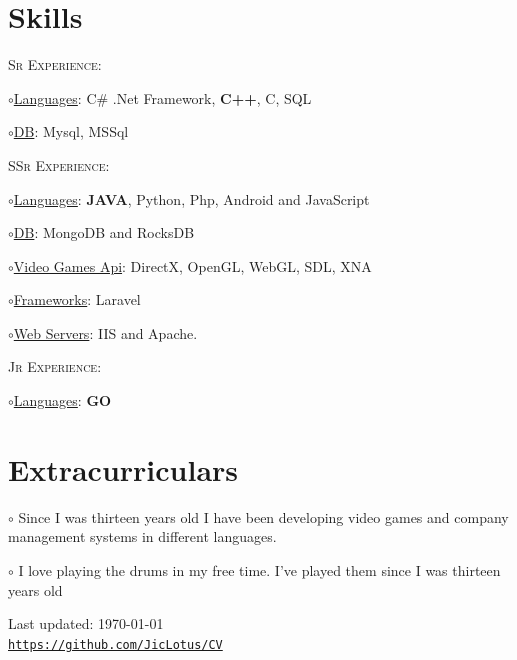\documentclass[letterpaper]{article}
\def\footerlink{https://github.com/JicLotus/CV}
\renewenvironment{itemize}{
  \begin{list}{}{
    \setlength{\leftmargin}{1.5em}
  }
}{
  \end{list}
}
\newenvironment{no-indent-itemize}{
  \begin{list}{}{
    \setlength{\leftmargin}{0em}
  }
}{
  \end{list}
}
\def\bullet{$\circ$\xspace}
\begin{document}
\section*{Skills}
\begin{no-indent-itemize}
    
    \item\textsc{Sr Experience}:
    \begin{itemize}
        \item\bullet \underline{Languages}: C\# .Net Framework, \textbf{C++}, C, SQL
        \item\bullet \underline{DB}: Mysql, MSSql
    \end{itemize} 
    \item \textsc{SSr Experience}:
    \begin{itemize}
        \item\bullet \underline{Languages}: \textbf{JAVA}, Python, Php, Android and JavaScript
        \item\bullet \underline{DB}: MongoDB and RocksDB
        \item\bullet \underline{Video Games Api}: DirectX, OpenGL, WebGL, SDL, XNA
        \item\bullet \underline{Frameworks}: Laravel
        \item\bullet \underline{Web Servers}: IIS and Apache.
    \end{itemize}     
    \item \textsc{Jr Experience}:
    \begin{itemize}
        \item\bullet \underline{Languages}: \textbf{GO}
    \end{itemize}      

\end{no-indent-itemize}



\section*{Extracurriculars}
\begin{no-indent-itemize}
    \item\bullet Since I was thirteen years old I have been developing video games and company management systems in different languages. 
    \item\bullet I love playing the drums in my free time. I've played them since I was thirteen years old
\end{no-indent-itemize}






\bigskip
\begin{center}
  \begin{footnotesize}
    Last updated: \today \\
    \href{\footerlink}{\texttt{\footerlink}}
  \end{footnotesize}
\end{center}
\end{document}
